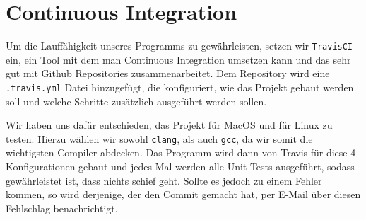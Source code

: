 \section{Continuous Integration}\label{sec:ContinousIntegration}
Um die Lauffähigkeit unseres Programms zu gewährleisten, setzen wir \texttt{TravisCI} ein, ein Tool mit dem man Continuous Integration umsetzen kann und das sehr gut mit Github Repositories zusammenarbeitet. Dem Repository wird eine \texttt{.travis.yml} Datei hinzugefügt, die konfiguriert, wie das Projekt gebaut werden soll und welche Schritte zusätzlich ausgeführt werden sollen.

Wir haben uns dafür entschieden, das Projekt für MacOS und für Linux zu testen. Hierzu wählen wir sowohl \texttt{clang}, als auch \texttt{gcc}, da wir somit die wichtigsten Compiler abdecken. Das Programm wird dann von Travis für diese 4 Konfigurationen gebaut und jedes Mal werden alle Unit-Tests ausgeführt, sodass gewährleistet ist, dass nichts schief geht. Sollte es jedoch zu einem Fehler kommen, so wird derjenige, der den Commit gemacht hat, per E-Mail über diesen Fehlschlag benachrichtigt.
